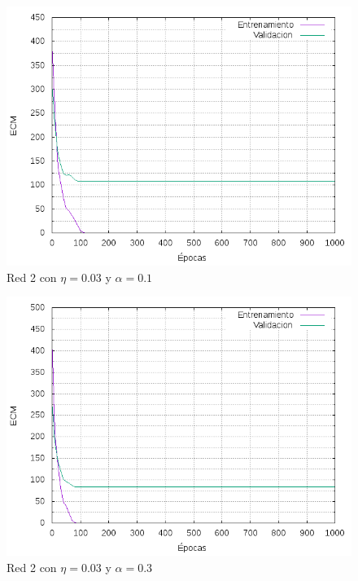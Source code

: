 \begin{figure}[H]
  \includegraphics[width=125mm]{imagenes/ej1/ex_2-2_red_11-21-1_errors.png}
  \caption{Red 2 con $\eta = 0.03$ y $  \alpha = 0.1$}
\end{figure}

\begin{figure}[H]
  \includegraphics[width=125mm]{imagenes/ej1/ex_2-3_red_11-21-1_errors.png}
  \caption{Red 2 con $\eta = 0.03 $ y $ \alpha = 0.3$}
\end{figure}

